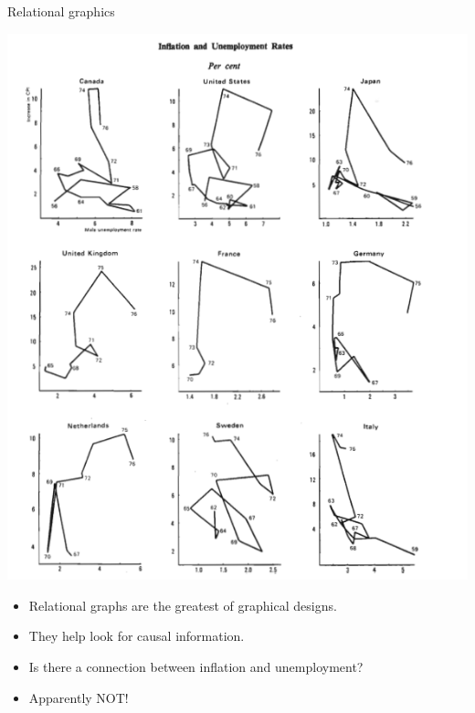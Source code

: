 \documentclass[
  ignorenonframetext,
]{beamer}
\begin{document}
\begin{frame}{Relational graphics}
\label{relational-graphics-3}
\begin{minipage}{0.45\textwidth}
\centering
\includegraphics[width=\textwidth]{excellence_figs/fig_26.png}
\end{minipage}
\hfill
\begin{minipage}{0.5\textwidth}
\footnotesize
\begin{itemize}
  \item Relational graphs are the greatest of graphical designs.
  \item They help look for causal information.
  \item Is there a connection between inflation and unemployment?
  \item Apparently NOT!
\end{itemize}
\end{minipage}
\end{frame}
\end{document}
